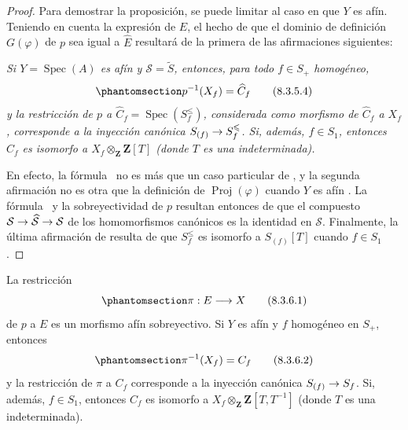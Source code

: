 \documentclass[oneside,10pt]{amsart}
\makeatletter
\renewcommand{\leq}{\leqslant}
\newcommand{\ega@arrow}[2]{\mathchoice{#1}{#2}{#2}{#2}}
\renewcommand{\to}{\ega@arrow{\longrightarrow}{\rightarrow}}
\let\EGAOriginalLabel\label
\renewcommand{\label}[1]{\phantomsection\EGAOriginalLabel{#1}}
\makeatother
\begin{document}
\begin{proof}
Para demostrar la proposición, se puede limitar al caso en que $Y$ es afín.
Teniendo en cuenta la expresión  de $\widehat{E}$, el hecho de que el dominio de definición $G(\varphi)$ de $p$ sea igual a $\widehat{E}$ resultará de la primera de las afirmaciones siguientes:
\begin{env}[8.3.5.3]
\label{II.8.3.5.3-fr}
\itshape Si $Y=\operatorname{Spec}(A)$ es afín y $\mathcal{S}=\widetilde{S}$, entonces, para todo $f\in S_+$ homogéneo,
\begin{equation}
\label{II.8.3.5.4-fr}
  p^{-1}(X_f)=\widehat{C}_f
\tag{8.3.5.4}
\end{equation}
y la restricción de $p$ a $\widehat{C}_f=\operatorname{Spec}(S_f^{\leq})$, considerada como morfismo de $\widehat{C}_f$ a $X_f$, corresponde a la inyección canónica $S_{(f)}\to S_f^{\leq}$.
Si, además, $f\in S_1$, entonces $\widehat{C}_f$ es isomorfo a $X_f\otimes_{\mathbf{Z}}\mathbf{Z}[T]$ (donde $T$ es una indeterminada).
\end{env}

En efecto, la fórmula~ no es más que un caso particular de , y la segunda afirmación no es otra que la definición de $\operatorname{Proj}(\varphi)$ cuando $Y$ es afín .
La fórmula~ y la sobreyectividad de $p$ resultan entonces de que el compuesto $\mathcal{S}\to\widehat{\mathcal{S}}\to\mathcal{S}$ de los homomorfismos canónicos es la identidad en $\mathcal{S}$.
Finalmente, la última afirmación de  resulta de que $S_f^{\leq}$ es isomorfo a $S_{(f)}[T]$ cuando $f\in S_1$ .
\end{proof}
\begin{corollary}[8.3.6]
\label{II.8.3.6-fr}
La restricción
\begin{equation}
\label{II.8.3.6.1-fr}
  \pi:E\to X
\tag{8.3.6.1}
\end{equation}
de $p$ a $E$ es un morfismo afín sobreyectivo.
Si $Y$ es afín y $f$ homogéneo en $S_+$, entonces
\begin{equation}
\label{II.8.3.6.2-fr}
  \pi^{-1}(X_f)=C_f
\tag{8.3.6.2}
\end{equation}
y la restricción de $\pi$ a $C_f$ corresponde a la inyección canónica $S_{(f)}\to S_f$.
Si, además, $f\in S_1$, entonces $C_f$ es isomorfo a $X_f\otimes_{\mathbf{Z}}\mathbf{Z}[T,T^{-1}]$ (donde $T$ es una indeterminada).
\end{corollary}
\end{document}
